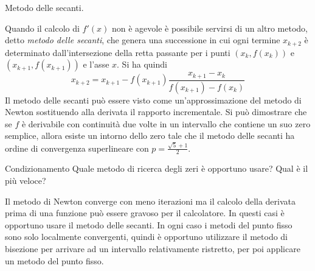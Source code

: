 \documentclass[answers, a4paper]{exam}
\begin{document}
\begin{questions}
\begin{solution}
	\end{solution}
	\question Metodo delle secanti.
	\begin{solution}
		Quando il calcolo di $f'(x)$ non è agevole è possibile servirsi di un altro metodo, detto \textit{metodo delle secanti}, che genera una successione in cui ogni termine $x_{k + 2}$ è determinato dall'intersezione della retta passante per i punti $(x_k, f(x_k))$ e $(x_{k + 1}, f(x_{k + 1}))$ e l'asse $x$. 
		Si ha quindi \begin{equation}x_{k + 2} = x_{k + 1} - f(x_{k + 1}) \frac{x_{k + 1} - x_k}{f(x_{k+1}) - f(x_k)}\end{equation}
		Il metodo delle secanti può essere visto come un'approssimazione del metodo di Newton sostituendo alla derivata il rapporto incrementale.
		Si può dimostrare che se $f$ è derivabile con continuità due volte in un intervallo che contiene un suo zero semplice, allora esiste un intorno dello zero tale che il metodo delle secanti ha ordine di convergenza superlineare con $p = \frac{\sqrt{5} + 1}{2}$.
	\end{solution}
	\question Condizionamento 
	\question Quale metodo di ricerca degli zeri è opportuno usare? Qual è il più veloce?
	\begin{solution}
		Il metodo di Newton converge con meno iterazioni ma il calcolo della derivata prima di una funzione può essere gravoso per il calcolatore.
		In questi casi è opportuno usare il metodo delle secanti. 
		In ogni caso i metodi del punto fisso sono solo localmente convergenti, quindi è opportuno utilizzare il metodo di bisezione per arrivare ad un intervallo relativamente ristretto, per poi applicare un metodo del punto fisso.
	\end{solution}

\end{questions}
\end{document}

